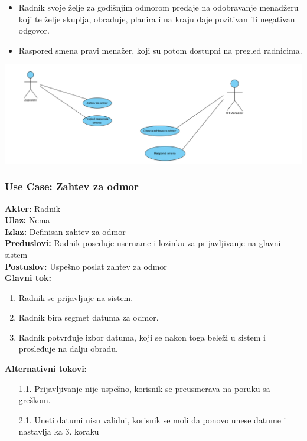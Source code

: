 \documentclass{article}
\begin{document}
\begin{itemize}
\item Radnik svoje želje za godišnjim odmorom predaje na odobravanje menadžeru koji te želje skuplja, obrađuje, planira i na kraju daje pozitivan ili negativan odgovor.
\item Raspored smena pravi menažer, koji su potom dostupni na pregled radnicima.
\end{itemize}
\includegraphics[width=\textwidth]{SU_4_hr.png}

\subsubsection{\textbf{Use Case}: Zahtev za odmor}
\textbf{Akter:} Radnik\\
\textbf{Ulaz:} Nema\\
\textbf{Izlaz:} Definisan zahtev za odmor\\
\textbf{Preduslovi:} Radnik poseduje username i lozinku za prijavljivanje na glavni sistem\\
\textbf{Postuslov:} Uspešno poslat zahtev za odmor\\
\textbf{Glavni tok:}
\begin{enumerate}
\item Radnik se prijavljuje na sistem.
\item Radnik bira segmet datuma za odmor.
\item Radnik potvrđuje izbor datuma, koji se nakon toga beleži u sistem i prosleđuje na dalju obradu.
\end{enumerate}
\textbf{Alternativni tokovi:} \\
\begin{itemize}
\item [1.1.] Prijavljivanje nije uspešno, korisnik se preusmerava na poruku sa greškom.
\item [2.1.] Uneti datumi nisu validni, korisnik se moli da ponovo unese datume i nastavlja ka 3. koraku
\end{itemize}
\end{document}
